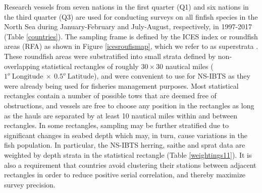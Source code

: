 \documentclass[a4paper 12pt]{article}
\numberwithin{equation}{section}
\begin{document}
\indent Research vessels from seven  nations in the first quarter (Q1) and six nations in the third quarter (Q3) are used for conducting surveys on all finfish species in the North Sea during January-February and July-August, respectively, in 1997-2017 (Table \ref{countries}). The sampling frame is defined by the ICES index or roundfish areas (RFA) as shown in Figure \ref{icesroufismap}, which we refer to as superstrata \citep{nottestad2015quantifying, fuller2011sampling}. These roundfish areas were substratified into small strata defined by non-overlapping statistical rectangles of roughly $30 \times 30$ nautical miles ($1^{o} \  \mathrm{Longitude} \ \times  \  0.5^{o} \ \mathrm{Latitude}$), and were convenient to use for NS-IBTS as they were already being used for fisheries management purposes. Most statistical rectangles contain a number of possible tows that are deemed free of obstructions, and vessels are free to choose any position in the rectangles as long as the hauls are separated by at least 10 nautical miles within and between rectangles. In some rectangles, sampling may be further stratified due to significant changes in seabed depth which may, in turn, cause variations in the fish population. In particular, the NS-IBTS herring, saithe and sprat data are weighted by depth strata in the statistical rectangle (Table \ref{weightings11}). It is also a requirement that countries avoid clustering their stations between adjacent rectangles in order to reduce positive serial correlation, and thereby maximize survey precision. \\
\end{document}
